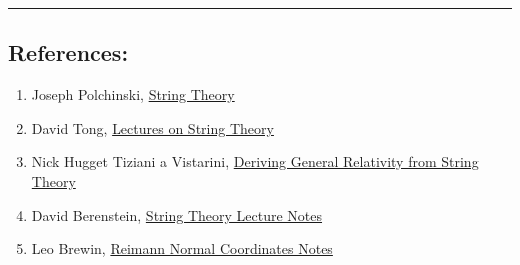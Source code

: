 \documentclass{article}
\begin{document}
\vspace{0.9cm}\hrule\vspace{0.3cm}
\subsection*{References:}
\begin{enumerate}
		\item Joseph Polchinski, \href{https://doi.org/10.1017/CBO9780511816079}{String Theory}
\item David Tong, \href{https://www.damtp.cam.ac.uk/user/tong/string.html}{Lectures on String Theory}
	\item  Nick Hugget  Tiziani   a Vistarini, \href{http://philsci-archive.pitt.edu/11116/1/Huggett-Vistarini.pdf}{Deriving General Relativity from String Theory}
	\item David Berenstein, \href{https://web.physics.ucsb.edu/~phys230A/w2016/Lecture_notes.html}{String Theory Lecture Notes}
    \item Leo Brewin, \href{https://users.monash.edu.au/~leo/research/papers/files/lcb96-01.pdf}{Reimann Normal Coordinates Notes} 
\end{enumerate}
\end{document}
